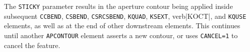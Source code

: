 The \verb|STICKY| parameter results in the aperture contour being applied inside subsequent \verb|CCBEND|, \verb|CSBEND|, \verb|CSRCSBEND|,
\verb|KQUAD|, \verb|KSEXT|, verb|KOCT|, and \verb|KQUSE| elements, as well as at the end of other downstream
 elements. This continues until another \verb|APCONTOUR| element asserts a new contour, or uses \verb|CANCEL=1|
to cancel the feature.
